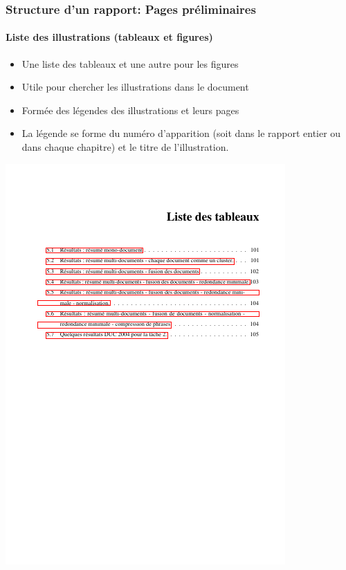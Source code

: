 \documentclass[xcolor=table]{beamer}
\begin{document}
\begin{frame}
\frametitle{Structure d'un rapport: Pages préliminaires}
\framesubtitle{Liste des illustrations (tableaux et figures)}

\begin{minipage}{0.52\textwidth}
	\begin{itemize}
		\item Une liste des tableaux et une autre pour les figures
		\item Utile pour chercher les illustrations dans le document
		\item Formée des légendes des illustrations et leurs pages
		\item La légende se forme du numéro d'apparition (soit dans le rapport entier ou dans chaque chapitre) et le titre de l'illustration.
	\end{itemize}
\end{minipage}
\begin{minipage}{0.42\textwidth}
	\includegraphics[width=\textwidth]{..//img/Bweb03-redaction/table-lst.png}
\end{minipage}

\end{frame}
\end{document}
